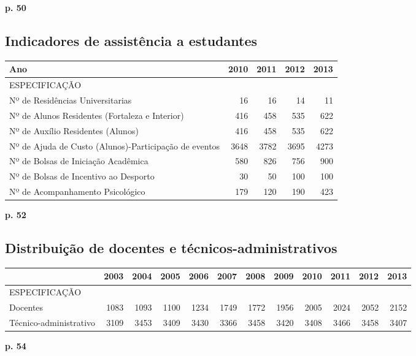 \documentclass{report}
\begin{document}
\textbf{p. 50}

\subsection{Indicadores de assistência a estudantes}
\begin{tabular}{lrrrr}
\toprule
Ano &  2010 &  2011 &  2012 &  2013 \\
\midrule
ESPECIFICAÇÃO                                         &       &       &       &       \\
Nº de Residências Universitarias                      &  16 &  16 &  14 &  11 \\
Nº de Alunos Residentes (Fortaleza e Interior)        &  416 &  458 &  535 &  622 \\
Nº de Auxílio Residentes (Alunos)                     &  416 &  458 &  535 &  622 \\
Nº de Ajuda de Custo (Alunos)-Participação de eventos &  3648 &  3782 &  3695 &  4273 \\
Nº de Bolsas de Iniciação Acadêmica                   &  580 &  826 &  756 &  900 \\
Nº de Bolsas de Incentivo ao Desporto                 &  30 &  50 &  100 &  100 \\
Nº de Acompanhamento Psicológico                      &  179 &  120 &  190 &  423 \\
\bottomrule
\end{tabular}

\textbf{p. 52}

\subsection{Distribuição de docentes e técnicos-administrativos}

\begin{tabular}{lrrrrrrrrrrr}
\toprule
{} &  2003 &  2004 &  2005 &  2006 &  2007 &  2008 &  2009 &  2010 &  2011 &  2012 &  2013 \\
\midrule
ESPECIFICAÇÃO          &       &       &       &       &       &       &       &       &       &       &       \\
Docentes               &  1083 &  1093 &  1100 &  1234 &  1749 &  1772 &  1956 &  2005 &  2024 &  2052 &  2152 \\
Técnico-administrativo &  3109 &  3453 &  3409 &  3430 &  3366 &  3458 &  3420 &  3408 &  3466 &  3458 &  3407 \\
\bottomrule
\end{tabular}
\textbf{p. 54}
\end{document}
